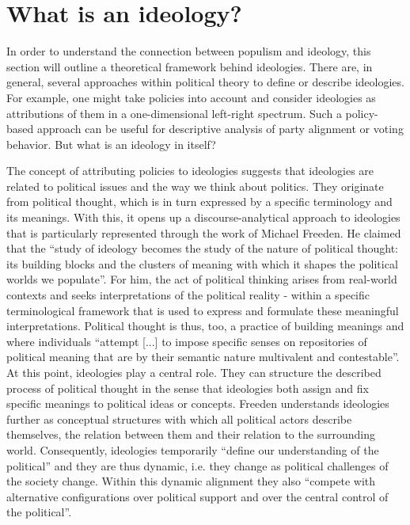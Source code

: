 \documentclass[a4paper]{scrreprt}
\begin{document}
\section{What is an ideology?}
In order to understand the connection between populism and ideology, this section will outline a theoretical framework behind ideologies. There are, in general, several approaches within political theory to define or describe ideologies. For example, one might take policies into account and consider ideologies as attributions of them in a one-dimensional left-right spectrum. Such a policy-based approach can be useful for descriptive analysis of party alignment or voting behavior. \citep[p.~154]{lembcke:2014} But what is an ideology in itself?\par
The concept of attributing policies to ideologies suggests that ideologies are related to political issues and the way we think about politics. They originate from political thought, which is in turn expressed by a specific terminology and its meanings. With this, it opens up a discourse-analytical approach to ideologies that is particularly represented through the work of Michael Freeden. He claimed that the ``study of ideology becomes the study of the nature of political thought: its building blocks and the clusters of meaning with which it shapes the political worlds we populate''. \cite[p.~15]{freeden:2006} For him, the act of political thinking arises from real-world contexts and seeks interpretations of the political reality - within a specific terminological framework that is used to express and formulate these meaningful interpretations. Political thought is thus, too, a practice of building meanings and where individuals ``attempt [...] to impose specific senses on repositories of political meaning that are by their semantic nature multivalent and contestable''. \cite[p.~19]{freeden:2006} At this point, ideologies play a central role. They can structure the described process of political thought in the sense that ideologies both assign and fix specific meanings to political ideas or concepts. Freeden understands ideologies further as conceptual structures with which all political actors describe themselves, the relation between them and their relation to the surrounding world. Consequently, ideologies temporarily ``define our understanding of the political'' and they are thus dynamic, i.e. they change as political challenges of the society change. Within this dynamic alignment they also ``compete with alternative configurations over political support and over the central control of the political''. \cite[p.~14]{freeden:2006}\par
\end{document}
